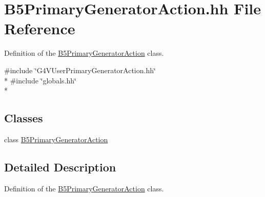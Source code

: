 \hypertarget{_b5_primary_generator_action_8hh}{}\section{B5\+Primary\+Generator\+Action.\+hh File Reference}
\label{_b5_primary_generator_action_8hh}


Definition of the \hyperlink{class_b5_primary_generator_action}{B5\+Primary\+Generator\+Action} class.  


{\ttfamily \#include \char`\"{}G4\+V\+User\+Primary\+Generator\+Action.\+hh\char`\"{}}\\*
{\ttfamily \#include \char`\"{}globals.\+hh\char`\"{}}\\*
\subsection*{Classes}
\begin{DoxyCompactItemize}
\item 
class \hyperlink{class_b5_primary_generator_action}{B5\+Primary\+Generator\+Action}
\end{DoxyCompactItemize}


\subsection{Detailed Description}
Definition of the \hyperlink{class_b5_primary_generator_action}{B5\+Primary\+Generator\+Action} class. 

